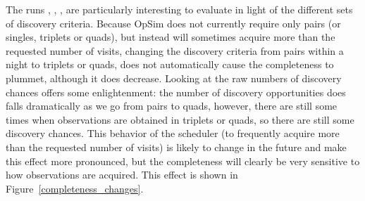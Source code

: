 The runs , ,
, 
are particularly interesting to evaluate in light of the different
sets of discovery criteria. Because OpSim does not currently require
only pairs (or singles, triplets or quads), but instead will sometimes
acquire more than the requested number of visits, changing the
discovery criteria from pairs within a night to triplets or quads,
does not automatically cause the completeness to plummet, although it
does decrease. Looking at the raw numbers of discovery chances offers some
enlightenment: the number of discovery opportunities does falls dramatically as we go from pairs to quads, however, there
are still some times when observations are obtained in triplets or
quads, so there are still some discovery chances. This behavior of the
scheduler (to frequently acquire more than the requested number of
visits) is likely to change in the future and make this effect more pronounced, but the completeness will
clearly be very sensitive to how observations are acquired. This effect is shown in
Figure~\ref{completeness_changes}.

